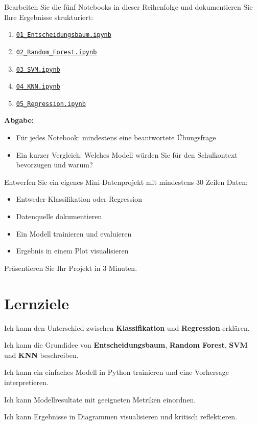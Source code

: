 \begin{myexercise}
Bearbeiten Sie die fünf Notebooks in dieser Reihenfolge und dokumentieren Sie
Ihre Ergebnisse strukturiert:
\begin{enumerate}
    \item \href{\notebookbaseurl01_Entscheidungsbaum_Classification.ipynb}{\texttt{01\_Entscheidungsbaum.ipynb}}
    \item \href{\notebookbaseurl02_Random_Forest_Classification.ipynb}{\texttt{02\_Random\_Forest.ipynb}}
    \item \href{\notebookbaseurl03_SVM_Classification.ipynb}{\texttt{03\_SVM.ipynb}}
    \item \href{\notebookbaseurl04_KNN_Classification.ipynb}{\texttt{04\_KNN.ipynb}}
    \item \href{\notebookbaseurl05_Regression_Prediction.ipynb}{\texttt{05\_Regression.ipynb}}
\end{enumerate}

\textbf{Abgabe:}
\begin{itemize}
    \item Für jedes Notebook: mindestens eine beantwortete Übungsfrage
    \item Ein kurzer Vergleich: Welches Modell würden Sie für den Schulkontext bevorzugen und warum?
\end{itemize}
\end{myexercise}

\begin{mychallenge}[Transferaufgabe]
Entwerfen Sie ein eigenes Mini-Datenprojekt mit mindestens 30 Zeilen Daten:
\begin{itemize}
    \item Entweder Klassifikation oder Regression
    \item Datenquelle dokumentieren
    \item Ein Modell trainieren und evaluieren
    \item Ergebnis in einem Plot visualisieren
\end{itemize}
Präsentieren Sie Ihr Projekt in 3 Minuten.
\end{mychallenge}

\section{Lernziele}
\begin{todolist}
    \item Ich kann den Unterschied zwischen \textbf{Klassifikation} und \textbf{Regression} erklären.
    \item Ich kann die Grundidee von \textbf{Entscheidungsbaum}, \textbf{Random Forest}, \textbf{SVM} und \textbf{KNN} beschreiben.
    \item Ich kann ein einfaches Modell in Python trainieren und eine Vorhersage interpretieren.
    \item Ich kann Modellresultate mit geeigneten Metriken einordnen.
    \item Ich kann Ergebnisse in Diagrammen visualisieren und kritisch reflektieren.
\end{todolist}
